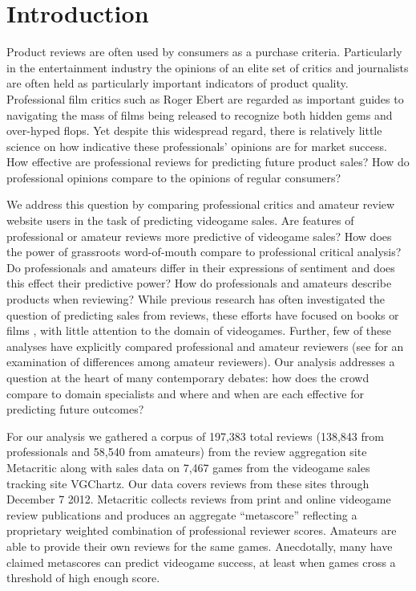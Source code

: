 \documentclass[letterpaper]{article}
\begin{document}
\section{Introduction}
Product reviews are often used by consumers as a purchase criteria. Particularly in the entertainment industry the opinions of an elite set of critics and journalists are often held as particularly important indicators of product quality. Professional film critics such as Roger Ebert are regarded as important guides to navigating the mass of films being released to recognize both hidden gems and over-hyped flops. Yet despite this widespread regard, there is relatively little science on how indicative these professionals' opinions are for market success. How effective are professional reviews for predicting future product sales? How do professional opinions compare to the opinions of regular consumers?

We address this question by comparing professional critics and amateur review website users in the task of predicting videogame sales. Are features of professional or amateur reviews more predictive of videogame sales? How does the power of grassroots word-of-mouth compare to professional critical analysis? Do professionals and amateurs differ in their expressions of sentiment and does this effect their predictive power? How do professionals and amateurs describe products when reviewing? While previous research has often investigated the question of predicting sales from reviews, these efforts have focused on books \cite{gruhl2005predictive} or films \cite{dellarocas2007exploring,yu2012mining,duan2008online,liu2001word}, with little attention to the domain of videogames.
Further, few of these analyses have explicitly compared professional and amateur reviewers (see \cite{gilbert2010deja} for an examination of differences among amateur reviewers). Our analysis addresses a question at the heart of many contemporary debates: how does the crowd compare to domain specialists and where and when are each effective for predicting future outcomes?

For our analysis we gathered a corpus of 197,383 total reviews (138,843 from professionals and 58,540 from amateurs) from the review aggregation site Metacritic along with sales data on 7,467 games from the videogame sales tracking site VGChartz. Our data covers reviews from these sites through December 7 2012. Metacritic collects reviews from print and online videogame review publications and produces an aggregate ``metascore'' reflecting a proprietary weighted combination of professional reviewer scores. Amateurs are able to provide their own reviews for the same games. Anecdotally, many have claimed metascores can predict videogame success, at least when games cross a threshold of high enough score. 
\end{document}
